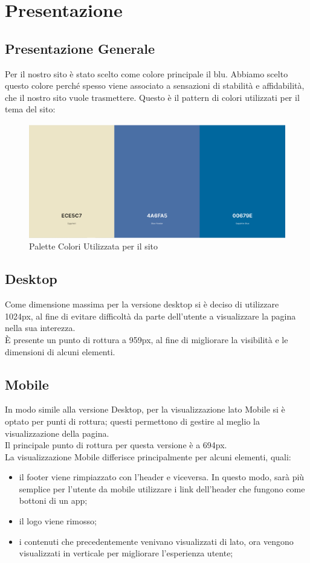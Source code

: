 \section{Presentazione}

  \subsection{Presentazione Generale}
    Per il nostro sito è stato scelto come colore principale il blu. Abbiamo scelto questo colore perché spesso viene associato a sensazioni di stabilità e affidabilità, che il nostro sito vuole trasmettere. 
    Questo è il pattern di colori utilizzati per il tema del sito:
    \begin{figure}[h]
      \includegraphics[scale=0.4]{Images/ColoriPaginaWeb.png}
      \caption{Palette Colori Utilizzata per il sito}
      \centering
    \end{figure}

  \subsection{Desktop}
    Come dimensione massima per la versione desktop si è deciso di utilizzare 1024px, al fine di evitare difficoltà da parte dell'utente a visualizzare la pagina nella sua interezza. \\
    È presente un punto di rottura a 959px, al fine di migliorare la visibilità e le dimensioni di alcuni elementi.

  \subsection{Mobile}
    In modo simile alla versione Desktop, per la visualizzazione lato Mobile si è optato per punti di rottura; questi permettono di gestire al meglio la visualizzazione della pagina. \\
    Il principale punto di rottura per questa versione è a 694px. \\
    La visualizzazione Mobile differisce principalmente per alcuni elementi, quali:
    \begin{itemize}
      \item il footer viene rimpiazzato con l'header e viceversa. In questo modo, sarà più semplice per l'utente da mobile utilizzare i link dell'header che fungono come bottoni di un app;
      \item il logo viene rimosso;
      \item i contenuti che precedentemente venivano visualizzati di lato, ora vengono visualizzati in verticale per migliorare l'esperienza utente;
    \end{itemize}

